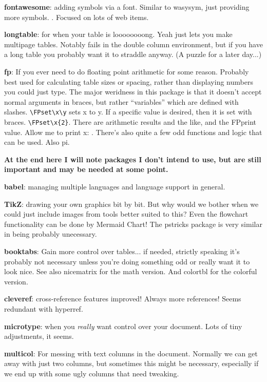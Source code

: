 \documentclass{article}
\begin{document}
\textbf{fontawesome}: adding symbols via a font. Similar to wasysym, just providing more symbols. \faicon{500px} \faAlignCenter \faApple \faBattery[1] \faCcMastercard \faDiamond \faDropbox \faEmpire \faFilePdfO \faFolderOpenO \faQq \faRecycle \faSpinner . Focused on lots of web items.

\textbf{longtable}: for when your table is loooooooong. Yeah just lets you make multipage tables. Notably fails in the double column environment, but if you have a long table you probably want it to straddle anyway. (A puzzle for a later day...)

\textbf{fp}: If you ever need to do floating point arithmetic for some reason. Probably best used for calculating table sizes or spacing, rather than displaying numbers you could just type. The major weridness in this package is that it doesn't accept normal arguments in braces, but rather ``variables'' which are defined with slashes. \verb|\FPset\x\y| sets x to y. If a specific value is desired, then it is set with braces. \verb|\FPset\x{2}|. There are arithmetic results and the like, and the FPprint value. Allow me to print x:\FPset{} \FPprint\x. There's also  quite a few odd functions and logic that can be used. Also pi. \FPprint\FPpi 

\textbf{At the end here I will note packages I don't intend to use, but are still important and may be needed at some point.}

\textbf{babel}: managing multiple languages and language support in general. 

\textbf{TikZ}: drawing your own graphics bit by bit. But why would we bother when we could just include images from tools better suited to this? Even the flowchart functionality can be done by Mermaid Chart! The pstricks package is very similar in being probably unecessary. 

\textbf{booktabs}: Gain more control over tables... if needed, strictly speaking it's probably not necessary unless you're doing something odd or really want it to look nice. See also nicematrix for the math version. And colortbl for the colorful version.

\textbf{cleveref}: cross-reference features improved! Always more references! Seems redundant with hyperref.

\textbf{microtype}: when you \emph{really} want control over your document. Lots of tiny adjustments, it seems.

\textbf{multicol}: For messing with text columns in the document. Normally we can get away with just two columns, but sometimes this might be necessary, especially if we end up with some ugly columns that need tweaking.
\end{document}

